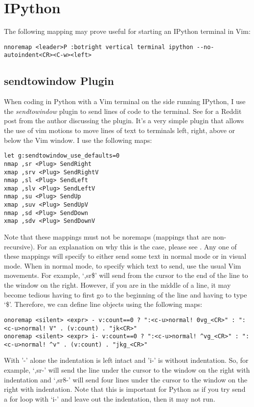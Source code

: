 \documentclass[10pt]{article}
\begin{document}
\section{IPython}
The following mapping may prove useful for starting an IPython terminal in
Vim:\\
\begin{lstlisting}
nnoremap <leader>P :botright vertical terminal ipython --no-autoindent<CR><C-w><left>
\end{lstlisting}

\subsection{sendtowindow Plugin}
When coding in Python with a Vim terminal on the side running IPython, I use the
\textit{sendtowindow} plugin \cite{KKPMW2016send} to send lines of code to the
terminal. See \cite{KKPMW2019send} for a Reddit post from the author discussing
the plugin. It's a very simple plugin that allows the use of vim motions to move
lines of text to terminals left, right, above or below the Vim window. I use the
following maps:\\
\begin{lstlisting}
let g:sendtowindow_use_defaults=0
nmap ,sr <Plug> SendRight
xmap ,srv <Plug> SendRightV
nmap ,sl <Plug> SendLeft
xmap ,slv <Plug> SendLeftV
nmap ,su <Plug> SendUp
xmap ,suv <Plug> SendUpV
nmap ,sd <Plug> SendDown
xmap ,sdv <Plug> SendDownV
\end{lstlisting}
Note that these mappings must not be noremaps (mappings that are non-recursive). For an
explanation on why this is the case, please see \cite{justrajdeep2018please}.
Any one of these mappings will specify to either send some text in normal mode
or in visual mode. When in normal mode, to specify which text to send, use the
usual Vim movements. For example, `,sr\$' will send from the cursor to the end
of the line to the window on the right. However, if you are in the middle of a
line, it may become tedious having to first go to the beginning of the line and
having to type `\$'. Therefore, we can define line objects using the following
maps:
\begin{lstlisting}
onoremap <silent> <expr> - v:count==0 ? ":<c-u>normal! 0vg_<CR>" : ":<c-u>normal! V" . (v:count) . "jk<CR>"
onoremap <silent> <expr> i- v:count==0 ? ":<c-u>normal! ^vg_<CR>" : ":<c-u>normal! ^v" . (v:count) . "jkg_<CR>"
\end{lstlisting}
With '-' alone the indentation is left intact and 'i-' is without indentation.
So, for example, `,sr-' will send the line under the cursor to the window on
the right with indentation and `,sr8-' will send four lines under the cursor to
the window on the right with indentation. Note that this is important for Python as if you try
send a for loop with `i-' and leave out the indentation, then it may not run.\\
\end{document}
